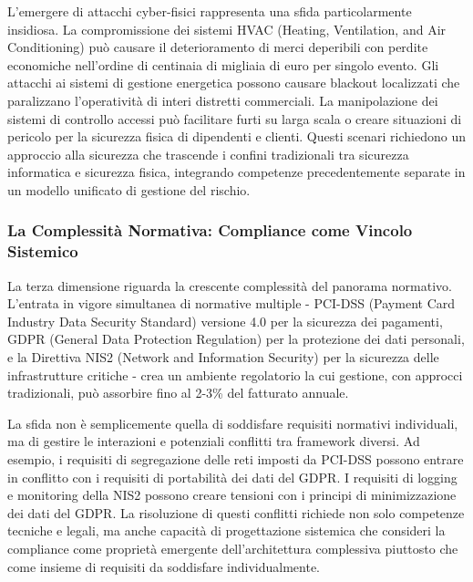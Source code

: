 L'emergere di attacchi cyber-fisici rappresenta una sfida particolarmente insidiosa. La compromissione dei sistemi HVAC (Heating, Ventilation, and Air Conditioning) può causare il deterioramento di merci deperibili con perdite economiche nell'ordine di centinaia di migliaia di euro per singolo evento. Gli attacchi ai sistemi di gestione energetica possono causare blackout localizzati che paralizzano l'operatività di interi distretti commerciali. La manipolazione dei sistemi di controllo accessi può facilitare furti su larga scala o creare situazioni di pericolo per la sicurezza fisica di dipendenti e clienti. Questi scenari richiedono un approccio alla sicurezza che trascende i confini tradizionali tra sicurezza informatica e sicurezza fisica, integrando competenze precedentemente separate in un modello unificato di gestione del rischio.

\subsubsection{La Complessità Normativa: Compliance come Vincolo Sistemico}

La terza dimensione riguarda la crescente complessità del panorama normativo. L'entrata in vigore simultanea di normative multiple - PCI-DSS (Payment Card Industry Data Security Standard) versione 4.0 per la sicurezza dei pagamenti, GDPR (General Data Protection Regulation) per la protezione dei dati personali, e la Direttiva NIS2 (Network and Information Security) per la sicurezza delle infrastrutture critiche - crea un ambiente regolatorio la cui gestione, con approcci tradizionali, può assorbire fino al 2-3\% del fatturato annuale\autocite{ponemon2024compliance}.

La sfida non è semplicemente quella di soddisfare requisiti normativi individuali, ma di gestire le interazioni e potenziali conflitti tra framework diversi. Ad esempio, i requisiti di segregazione delle reti imposti da PCI-DSS possono entrare in conflitto con i requisiti di portabilità dei dati del GDPR. I requisiti di logging e monitoring della NIS2 possono creare tensioni con i principi di minimizzazione dei dati del GDPR. La risoluzione di questi conflitti richiede non solo competenze tecniche e legali, ma anche capacità di progettazione sistemica che consideri la compliance come proprietà emergente dell'architettura complessiva piuttosto che come insieme di requisiti da soddisfare individualmente.

